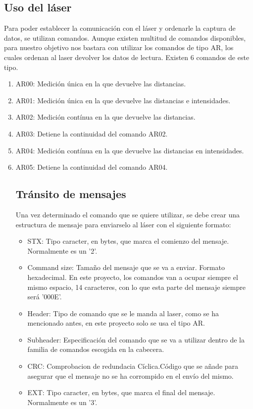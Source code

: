 \subsection{Uso del láser}
Para poder establecer la comunicación con el láser y ordenarle la captura de datos, se utilizan comandos. Aunque existen multitud de comandos disponibles, para nuestro objetivo nos bastara con utilizar los comandos de tipo AR, los cuales ordenan al laser devolver los datos de lectura.
Existen 6 comandos de este tipo.
\begin{enumerate}
	\item AR00: Medición única en la que devuelve las distancias.
	\item AR01: Medición única en la que devuelve las distancias e intensidades.
	\item AR02: Medición contínua en la que devuelve las distancias.
	\item AR03: Detiene la continuidad del comando AR02.
	\item AR04: Medición contínua en la que devuelve las distancias en intensidades.
	\item AR05: Detiene la continuidad del comando AR04.


\subsection{Tránsito de mensajes}
Una vez determinado el comando que se quiere utilizar, se debe crear una estructura de mensaje para enviarselo al láser con el siguiente formato:
\begin{itemize}
	\item STX: Tipo caracter, en bytes, que marca el comienzo del mensaje. Normalmente es un '2'.
 	\item Command size: Tamaño del mensaje que se va a enviar. Formato hexadecimal. En este proyecto, los comandos van a ocupar siempre el mismo espacio, 14 caracteres, con lo que esta parte del mensaje siempre será '000E'.
 	\item Header: Tipo de comando que se le manda al laser, como se ha mencionado antes, en este proyecto solo se usa el tipo AR.
 	\item Subheader: Especificación del comando que se va a utilizar dentro de la familia de comandos escogida en la cabecera.
 	\item CRC:  Comprobacion de redundacia Cíclica.Código que se añade para asegurar que el mensaje no se ha corrompido en el envío del mismo. 
 	\item EXT: Tipo caracter, en bytes, que marca el final del mensaje. Normalmente es un '3'.
 \end{itemize}


\end{enumerate}
